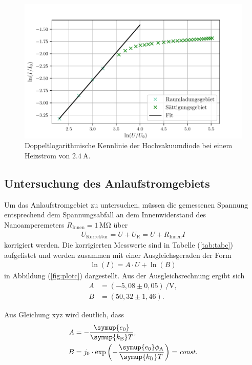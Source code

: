 \begin{figure}
  \centering
  \includegraphics{plotb.pdf}
  \caption{Doppeltlogarithmische Kennlinie der Hochvakuumdiode bei einem Heizstrom von $\SI{2.4}{\ampere}$.}
  \label{fig:plotb}
\end{figure}

\subsection{Untersuchung des Anlaufstromgebiets}
Um das Anlaufstromgebiet zu untersuchen, müssen die gemessenen Spannung entsprechend
dem Spannungsabfall an dem Innenwiderstand des Nanoamperemeters $R_\text{Innen} = 1\,\si{\mega\ohm}$
über
\begin{align*}
U_\text{Korrektur} = U + U_\text{R} = U + R_\text{Innen} I
\end{align*}
korrigiert werden. Die korrigierten Messwerte sind in Tabelle (\ref{tab:tabc}) aufgelistet und werden
zusammen mit einer Ausgleichsgeraden der Form
\begin{align*}
\ln(I) = A\cdot U + \ln(B)
\end{align*} 
in Abbildung (\ref{fig:plotc}) dargestellt. Aus der Ausgleichsrechnung ergibt sich
\begin{align*}
A &= (-5,08 \pm 0,05)\,\si{\per\volt},\\
B &= (50,32 \pm 1,46).
\end{align*}

Aus Gleichung xyz wird deutlich, dass
\begin{align*}
  A &= -\frac{\symup{e_\text{0}}}{\symup{k_\text{B}} T}, \\
  B &= j_0 \cdot \exp\left(-\frac{\symup{e_\text{0}} \phi_\text{A}}{\symup{k_\text{B}} T}\right) = \mathit{const}.
\end{align*}

